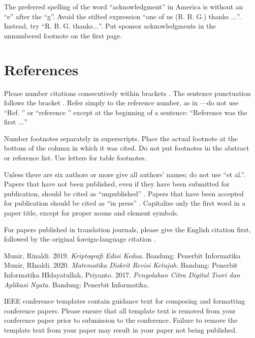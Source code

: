 \documentclass[10pt,conference]{IEEEtran}
\begin{document}
The preferred spelling of the word ``acknowledgment'' in America is without 
an ``e'' after the ``g''. Avoid the stilted expression ``one of us (R. B. 
G.) thanks $\ldots$''. Instead, try ``R. B. G. thanks$\ldots$''. Put sponsor 
acknowledgments in the unnumbered footnote on the first page.

\section*{References}

Please number citations consecutively within brackets \cite{b1}. The 
sentence punctuation follows the bracket \cite{b2}. Refer simply to the reference 
number, as in \cite{b3}---do not use ``Ref. \cite{b3}'' or ``reference \cite{b3}'' except at 
the beginning of a sentence: ``Reference \cite{b3} was the first $\ldots$''

Number footnotes separately in superscripts. Place the actual footnote at 
the bottom of the column in which it was cited. Do not put footnotes in the 
abstract or reference list. Use letters for table footnotes.

Unless there are six authors or more give all authors' names; do not use 
``et al.''. Papers that have not been published, even if they have been 
submitted for publication, should be cited as ``unpublished'' \cite{b4}. Papers 
that have been accepted for publication should be cited as ``in press'' \cite{b5}. 
Capitalize only the first word in a paper title, except for proper nouns and 
element symbols.

For papers published in translation journals, please give the English 
citation first, followed by the original foreign-language citation \cite{b6}.

\begin{thebibliography}{00}
 Munir, Rinaldi. 2019. \emph{Kriptografi Edisi Kedua}. Bandung: Penerbit Informatika 
 Munir, RInaldi. 2020. \emph{Matematika Diskrit Revisi Ketujuh}. Bandung: Penerbit Informatika
 HIdayatullah, Priyanto. 2017. \emph{Pengolahan Citra Digital Teori dan Aplikasi Nyata}. Bandung: Penerbit Informatika.

\end{thebibliography}
\vspace{12pt}
\color{red}
IEEE conference templates contain guidance text for composing and formatting conference papers. Please ensure that all template text is removed from your conference paper prior to submission to the conference. Failure to remove the template text from your paper may result in your paper not being published.
\end{document}
